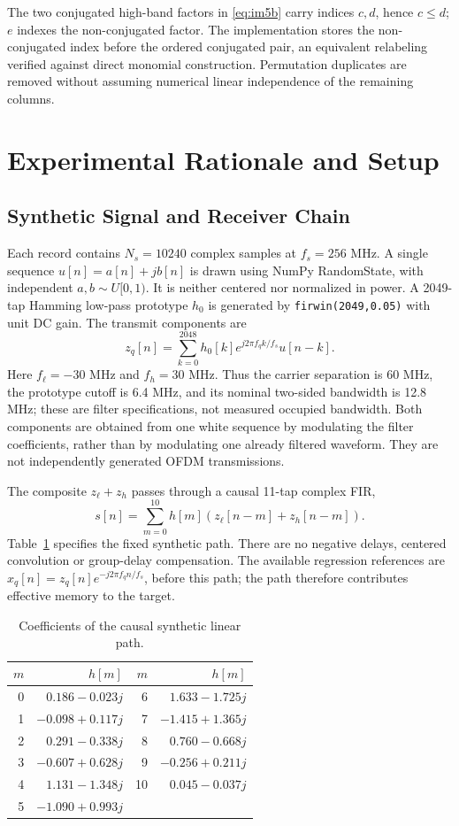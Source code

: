 \documentclass[conference]{IEEEtran}
\begin{document}
The two conjugated high-band factors in \eqref{eq:im5b} carry indices $c,d$, hence $c\leq d$; $e$ indexes the non-conjugated factor. The implementation stores the non-conjugated index before the ordered conjugated pair, an equivalent relabeling verified against direct monomial construction. Permutation duplicates are removed without assuming numerical linear independence of the remaining columns.

\section{Experimental Rationale and Setup}\label{sec:setup}
\subsection{Synthetic Signal and Receiver Chain}
Each record contains $N_s=10240$ complex samples at $f_s=256$ MHz. A single sequence $u[n]=a[n]+jb[n]$ is drawn using NumPy RandomState, with independent $a,b\sim U[0,1)$. It is neither centered nor normalized in power. A 2049-tap Hamming low-pass prototype $h_0$ is generated by \texttt{firwin(2049,0.05)} with unit DC gain. The transmit components are
\begin{equation}
 z_q[n]=\sum_{k=0}^{2048}h_0[k]e^{j2\pi f_qk/f_s}u[n-k].
 \label{eq:tx-generation}
\end{equation}
Here $f_\ell=-30$ MHz and $f_h=30$ MHz. Thus the carrier separation is 60 MHz, the prototype cutoff is 6.4 MHz, and its nominal two-sided bandwidth is 12.8 MHz; these are filter specifications, not measured occupied bandwidth. Both components are obtained from one white sequence by modulating the filter coefficients, rather than by modulating one already filtered waveform. They are not independently generated OFDM transmissions.

The composite $z_\ell+z_h$ passes through a causal 11-tap complex FIR,
\begin{equation}
 s[n]=\sum_{m=0}^{10}h[m](z_\ell[n-m]+z_h[n-m]).
 \label{eq:linear-path}
\end{equation}
Table~\ref{tab:path} specifies the fixed synthetic path. There are no negative delays, centered convolution or group-delay compensation. The available regression references are $x_q[n]=z_q[n]e^{-j2\pi f_qn/f_s}$, before this path; the path therefore contributes effective memory to the target.
\begin{table}[!t]
\caption{Coefficients of the causal synthetic linear path.}\label{tab:path}
\centering\scriptsize
\begin{tabular}{rr@{\qquad}rr}\toprule
$m$ & $h[m]$ & $m$ & $h[m]$\\\midrule
0 & $0.186-0.023j$ & 6 & $1.633-1.725j$\\
1 & $-0.098+0.117j$ & 7 & $-1.415+1.365j$\\
2 & $0.291-0.338j$ & 8 & $0.760-0.668j$\\
3 & $-0.607+0.628j$ & 9 & $-0.256+0.211j$\\
4 & $1.131-1.348j$ & 10 & $0.045-0.037j$\\
5 & $-1.090+0.993j$ & & \\\bottomrule
\end{tabular}
\end{table}
\end{document}
